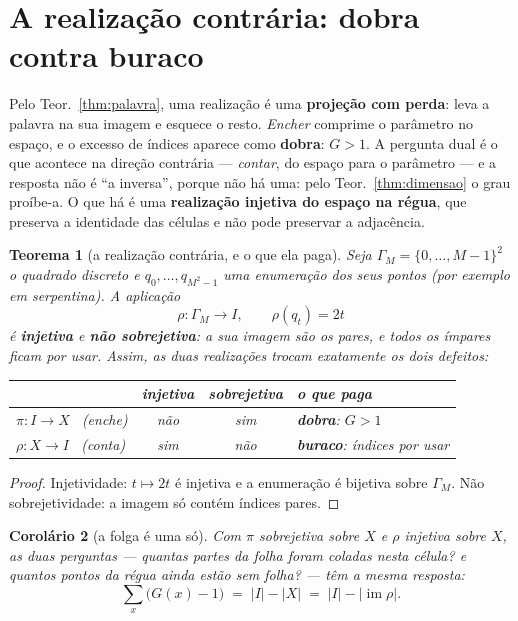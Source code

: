 \documentclass[11pt,a4paper]{article}
\newcommand{\abs}[1]{\lvert #1\rvert}
\newtheorem{teorema}{Teorema}
\newtheorem{corolario}[teorema]{Corolário}
\begin{document}
\section{A realização contrária: dobra contra buraco}\label{sec:dual}

\noindent Pelo Teor.~\ref{thm:palavra}, uma realização é uma \textbf{projeção com
perda}: leva a palavra na sua imagem e esquece o resto. \emph{Encher} comprime o
parâmetro no espaço, e o excesso de índices aparece como \textbf{dobra}: $G>1$. A pergunta dual é o que
acontece na direção contrária --- \emph{contar}, do espaço para o parâmetro --- e
a resposta não é ``a inversa'', porque não há uma: pelo Teor.~\ref{thm:dimensao}
o grau proíbe-a. O que há é uma \textbf{realização injetiva do espaço na régua},
que preserva a identidade das células e não pode preservar a adjacência.

\begin{teorema}[a realização contrária, e o que ela paga]\label{thm:contraria}
Seja $\Gamma_M=\{0,\dots,M-1\}^2$ o quadrado discreto e $q_0,\dots,q_{M^2-1}$ uma
enumeração dos seus pontos (por exemplo em serpentina). A aplicação
\[
\rho\colon \Gamma_M\longrightarrow I,\qquad \rho(q_t)=2t
\]
é \textbf{injetiva} e \textbf{não sobrejetiva}: a sua imagem são os pares, e
todos os ímpares ficam por usar. Assim, as duas realizações trocam exatamente os
dois defeitos:
\begin{center}\small
\begin{tabular}{@{}lccl@{}}
\toprule
 & injetiva & sobrejetiva & o que paga \\
\midrule
$\pi\colon I\to X$ \ (enche) & não & sim & \textbf{dobra}: $G>1$ \\
$\rho\colon X\to I$ \ (conta) & sim & não & \textbf{buraco}: índices por usar \\
\bottomrule
\end{tabular}
\end{center}
\end{teorema}

\begin{proof}
Injetividade: $t\mapsto2t$ é injetiva e a enumeração é bijetiva sobre $\Gamma_M$.
Não sobrejetividade: a imagem só contém índices pares.
\end{proof}

\begin{corolario}[a folga é uma só]\label{cor:folga}
Com $\pi$ sobrejetiva sobre $X$ e $\rho$ injetiva sobre $X$, as duas perguntas
--- \emph{quantas partes da folha foram coladas nesta célula?} e \emph{quantos
pontos da régua ainda estão sem folha?} --- têm a mesma resposta:
\[
\sum_{x}\bigl(G(x)-1\bigr)\;=\;\abs{I}-\abs{X}\;=\;\abs{I}-\lvert\operatorname{im}\rho\rvert .
\]
\end{corolario}
\end{document}
